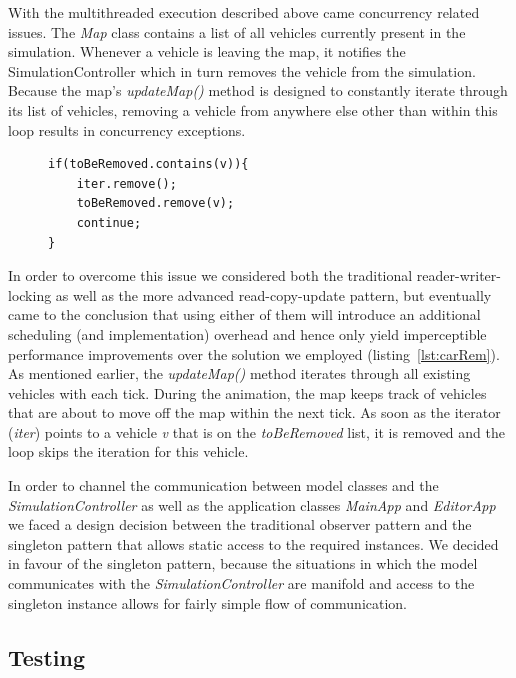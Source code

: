 With the multithreaded execution described above came concurrency related issues. The \textit{Map} class contains a list of all vehicles currently present in the simulation. Whenever a vehicle is leaving the map, it notifies the SimulationController which in turn removes the vehicle from the simulation. Because the map's \textit{updateMap()} method is designed to constantly iterate through its list of vehicles, removing a vehicle from anywhere else other than within this loop results in concurrency exceptions.

\begin{figure}
	\begin{minipage}{0.45\textwidth}
		\begin{lstlisting}[caption={Car Removal}, label={lst:carRem}]
if(toBeRemoved.contains(v)){
	iter.remove();
	toBeRemoved.remove(v);
	continue;
}	
		\end{lstlisting}
	\end{minipage}
\end{figure}

In order to overcome this issue we considered both the traditional reader-writer-locking as well as the more advanced read-copy-update pattern, but eventually came to the conclusion that using either of them will introduce an additional scheduling (and implementation) overhead and hence only yield imperceptible performance improvements over the solution we employed (listing~\ref{lst:carRem}). As mentioned earlier, the \textit{updateMap()} method iterates through all existing vehicles with each tick. During the animation, the map keeps track of vehicles that are about to move off the map within the next tick. As soon as the iterator (\textit{iter}) points to a vehicle \textit{v} that is on the \textit{toBeRemoved} list, it is removed and the loop skips the iteration for this vehicle.

In order to channel the communication between model classes and the \textit{SimulationController} as well as the application classes \textit{MainApp} and \textit{EditorApp} we faced a design decision between the traditional observer pattern and the singleton pattern that allows static access to the required instances. We decided in favour of the singleton pattern, because the situations in which the model communicates with the \textit{SimulationController} are manifold and access to the singleton instance allows for fairly simple flow of communication.

\subsection{Testing}
 

